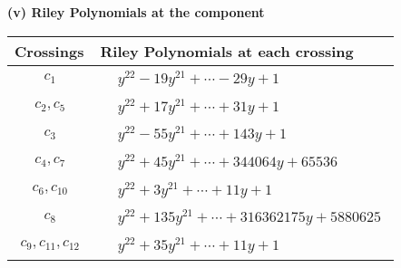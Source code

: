 \documentclass[1p]{elsarticle_modified}
\theoremstyle{definition}
\begin{document}
\newpage\renewcommand{\arraystretch}{1}
\flushleft \textbf{(v) Riley Polynomials at the component}\newline \\
\begin{tabular}{m{50pt}|m{274pt}}
Crossings & \hspace{64pt}Riley Polynomials at each crossing \\
\hline $$\begin{aligned}c_{1}\end{aligned}$$&$\begin{aligned}
&y^{22}-19 y^{21}+\cdots-29 y+1
\end{aligned}$\\
\hline $$\begin{aligned}c_{2},c_{5}\end{aligned}$$&$\begin{aligned}
&y^{22}+17 y^{21}+\cdots+31 y+1
\end{aligned}$\\
\hline $$\begin{aligned}c_{3}\end{aligned}$$&$\begin{aligned}
&y^{22}-55 y^{21}+\cdots+143 y+1
\end{aligned}$\\
\hline $$\begin{aligned}c_{4},c_{7}\end{aligned}$$&$\begin{aligned}
&y^{22}+45 y^{21}+\cdots+344064 y+65536
\end{aligned}$\\
\hline $$\begin{aligned}c_{6},c_{10}\end{aligned}$$&$\begin{aligned}
&y^{22}+3 y^{21}+\cdots+11 y+1
\end{aligned}$\\
\hline $$\begin{aligned}c_{8}\end{aligned}$$&$\begin{aligned}
&y^{22}+135 y^{21}+\cdots+316362175 y+5880625
\end{aligned}$\\
\hline $$\begin{aligned}c_{9},c_{11},c_{12}\end{aligned}$$&$\begin{aligned}
&y^{22}+35 y^{21}+\cdots+11 y+1
\end{aligned}$\\
\hline
\end{tabular}\\~\\
\end{document}
